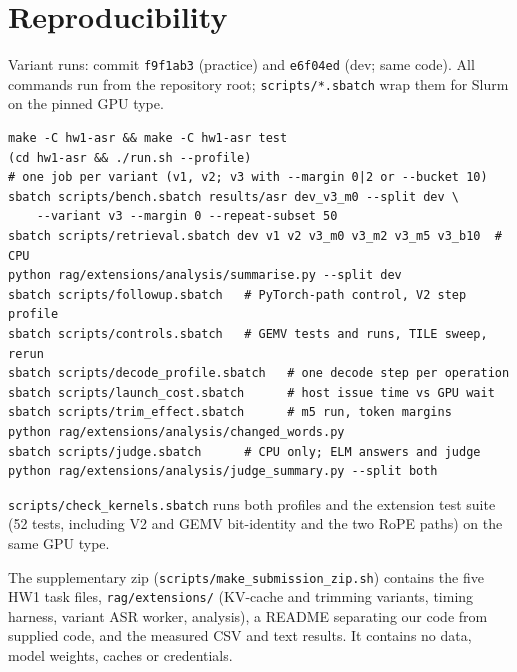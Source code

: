 \documentclass{article}
\begin{document}
{\centering\small\par\medskip\par\medskip\par}

\section{Reproducibility}
\label{app:repro}

Variant runs: commit \texttt{f9f1ab3} (practice) and \texttt{e6f04ed} (dev; same code).
All commands run from the repository root;
\texttt{scripts/*.sbatch} wrap them for Slurm on the pinned GPU type.
\begin{small}
\begin{verbatim}
make -C hw1-asr && make -C hw1-asr test
(cd hw1-asr && ./run.sh --profile)
# one job per variant (v1, v2; v3 with --margin 0|2 or --bucket 10)
sbatch scripts/bench.sbatch results/asr dev_v3_m0 --split dev \
    --variant v3 --margin 0 --repeat-subset 50
sbatch scripts/retrieval.sbatch dev v1 v2 v3_m0 v3_m2 v3_m5 v3_b10  # CPU
python rag/extensions/analysis/summarise.py --split dev
sbatch scripts/followup.sbatch   # PyTorch-path control, V2 step profile
sbatch scripts/controls.sbatch   # GEMV tests and runs, TILE sweep, rerun
sbatch scripts/decode_profile.sbatch   # one decode step per operation
sbatch scripts/launch_cost.sbatch      # host issue time vs GPU wait
sbatch scripts/trim_effect.sbatch      # m5 run, token margins
python rag/extensions/analysis/changed_words.py
sbatch scripts/judge.sbatch      # CPU only; ELM answers and judge
python rag/extensions/analysis/judge_summary.py --split both
\end{verbatim}
\end{small}
\texttt{scripts/check\_kernels.sbatch} runs both profiles and the extension test
suite (52 tests, including V2 and GEMV bit-identity and the two RoPE paths) on the same GPU type.

The supplementary zip (\texttt{scripts/make\_submission\_zip.sh}) contains the five
HW1 task files, \texttt{rag/extensions/} (KV-cache and trimming variants, timing
harness, variant ASR worker, analysis), a README separating our code from supplied
code, and the measured CSV and text results. It contains no data, model weights,
caches or credentials.

\newpage
\end{document}
